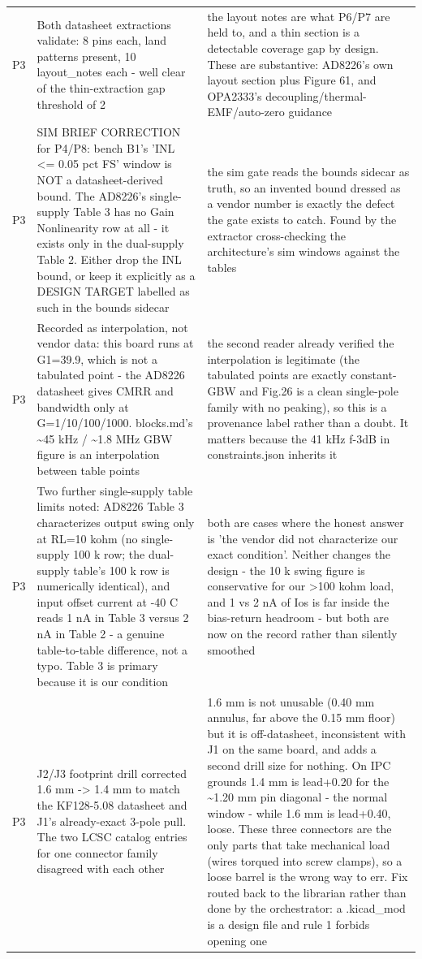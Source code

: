\documentclass[11pt,a4paper]{article}
\begin{document}
{\begin{longtable}{lp{5.2cm}p{7.2cm}}
P3 & Both datasheet extractions validate: 8 pins each, land patterns present, 10 layout\_notes each - well clear of the thin-extraction gap threshold of 2 & the layout notes are what P6/P7 are held to, and a thin section is a detectable coverage gap by design. These are substantive: AD8226's own layout section plus Figure 61, and OPA2333's decoupling/thermal-EMF/auto-zero guidance \\
P3 & SIM BRIEF CORRECTION for P4/P8: bench B1's 'INL \textless{}= 0.05 pct FS' window is NOT a datasheet-derived bound. The AD8226's single-supply Table 3 has no Gain Nonlinearity row at all - it exists only in the dual-supply Table 2. Either drop the INL bound, or keep it explicitly as a DESIGN TARGET labelled as such in the bounds sidecar & the sim gate reads the bounds sidecar as truth, so an invented bound dressed as a vendor number is exactly the defect the gate exists to catch. Found by the extractor cross-checking the architecture's sim windows against the tables \\
P3 & Recorded as interpolation, not vendor data: this board runs at G1=39.9, which is not a tabulated point - the AD8226 datasheet gives CMRR and bandwidth only at G=1/10/100/1000. blocks.md's \textasciitilde{}45 kHz / \textasciitilde{}1.8 MHz GBW figure is an interpolation between table points & the second reader already verified the interpolation is legitimate (the tabulated points are exactly constant-GBW and Fig.26 is a clean single-pole family with no peaking), so this is a provenance label rather than a doubt. It matters because the 41 kHz f-3dB in constraints.json inherits it \\
P3 & Two further single-supply table limits noted: AD8226 Table 3 characterizes output swing only at RL=10 kohm (no single-supply 100 k row; the dual-supply table's 100 k row is numerically identical), and input offset current at -40 C reads 1 nA in Table 3 versus 2 nA in Table 2 - a genuine table-to-table difference, not a typo. Table 3 is primary because it is our condition & both are cases where the honest answer is 'the vendor did not characterize our exact condition'. Neither changes the design - the 10 k swing figure is conservative for our \textgreater{}100 kohm load, and 1 vs 2 nA of Ios is far inside the bias-return headroom - but both are now on the record rather than silently smoothed \\
P3 & J2/J3 footprint drill corrected 1.6 mm -\textgreater{} 1.4 mm to match the KF128-5.08 datasheet and J1's already-exact 3-pole pull. The two LCSC catalog entries for one connector family disagreed with each other & 1.6 mm is not unusable (0.40 mm annulus, far above the 0.15 mm floor) but it is off-datasheet, inconsistent with J1 on the same board, and adds a second drill size for nothing. On IPC grounds 1.4 mm is lead+0.20 for the \textasciitilde{}1.20 mm pin diagonal - the normal window - while 1.6 mm is lead+0.40, loose. These three connectors are the only parts that take mechanical load (wires torqued into screw clamps), so a loose barrel is the wrong way to err. Fix routed back to the librarian rather than done by the orchestrator: a .kicad\_mod is a design file and rule 1 forbids opening one \\

\end{longtable}}
\end{document}
